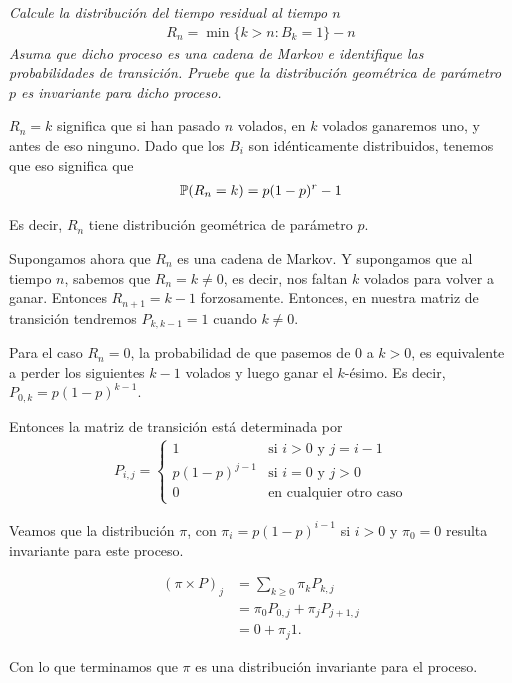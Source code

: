 \emph{
    Calcule la distribución del tiempo residual al tiempo $n$
        \begin{align}
                R_n = \min\{k > n: B_k = 1\} - n
        \end{align}
    Asuma que dicho proceso es una cadena de Markov e identifique las probabilidades de transición.
    Pruebe que la distribución geométrica de parámetro $p$ es invariante para dicho proceso.
}

\afterstatement\pn

$R_n = k$ significa que si han pasado $n$ volados, en $k$ volados ganaremos uno, y antes de eso ninguno.
Dado que los $B_i$ son idénticamente distribuidos, tenemos que eso significa que
\begin{align}
        \P(R_n = k) = p (1-p)^r-1
\end{align}\pn

Es decir, $R_n$ tiene distribución geométrica de parámetro $p$.\pn

Supongamos ahora que $R_n$ es una cadena de Markov. Y supongamos que al tiempo $n$, sabemos que
$R_n = k \neq 0$, es decir, nos faltan $k$ volados para volver a ganar. Entonces $R_{n+1} = k-1$ forzosamente.\pn
Entonces, en nuestra matriz de transición tendremos $P_{k, k-1} = 1$ cuando $k \neq 0$.\pn

Para el caso $R_n = 0$, la probabilidad de que pasemos de $0$ a $k>0$, es equivalente a perder los siguientes $k-1$ volados y luego
ganar el $k$-ésimo. Es decir, $P_{0, k} = p (1-p)^{k-1}$.\pn

Entonces la matriz de transición está determinada por
\begin{align}
        P_{i,j} =
                    \begin{cases}
                        1               &   \text{si $i > 0$ y $j = i - 1$}     \\
                        p (1-p)^{j-1}   &   \text{si $i = 0$ y $j>0$}           \\
                        0               &   \text{en cualquier otro caso}
                    \end{cases}
\end{align}\pn

Veamos que la distribución $\pi$, con $\pi_i = p (1-p)^{i-1}$ si $i>0$ y $\pi_0 = 0$ resulta invariante para este proceso.

\begin{align}
        (\pi \times P)_{j}      &=  \sum_{k \geq 0} \pi_{k} P_{k,j}     \\
                                &=  \pi_0 P_{0, j} + \pi_{j} P_{j+1, j} \\
                                &=  0 + \pi_{j} 1.
\end{align}\pn

Con lo que terminamos que $\pi$ es una distribución invariante para el proceso.